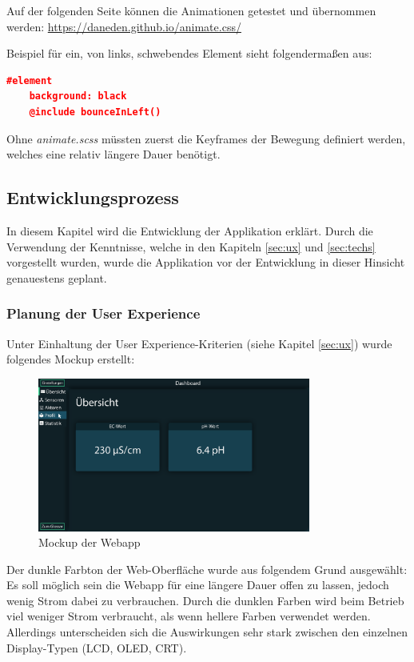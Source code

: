 Auf der folgenden Seite können die Animationen getestet und übernommen werden: \url{https://daneden.github.io/animate.css/}

Beispiel für ein, von links, schwebendes Element sieht folgendermaßen aus:
\begin{lstlisting}[language=json, caption={Animate.scss in Anwendung}]
#element
    background: black
    @include bounceInLeft()
\end{lstlisting}
\lstset{escapechar=@,style=customjava}

Ohne \textit{animate.scss} müssten zuerst die Keyframes der Bewegung definiert werden, welches eine relativ längere Dauer benötigt.
\clearpage
\subsection{Entwicklungsprozess}
In diesem Kapitel wird die Entwicklung der Applikation erklärt. Durch die Verwendung der Kenntnisse, welche in den Kapiteln \ref{sec:ux} und \ref{sec:techs} vorgestellt wurden, wurde die Applikation vor der Entwicklung in dieser Hinsicht genauestens geplant.

\subsubsection{Planung der User Experience}

Unter Einhaltung der User Experience-Kriterien (siehe Kapitel \ref{sec:ux}) wurde folgendes Mockup erstellt:

\begin{figure}[ht]
    \centering
	\includegraphics[width=0.8\textwidth]{images/webapp-mockup-normal}
	\caption{Mockup der Webapp}
\end{figure}

Der dunkle Farbton der Web-Oberfläche wurde aus folgendem Grund ausgewählt: Es soll möglich sein die Webapp für eine längere Dauer offen zu lassen, jedoch wenig Strom dabei zu verbrauchen. Durch die dunklen Farben wird beim Betrieb viel weniger Strom verbraucht, als wenn hellere Farben verwendet werden. Allerdings unterscheiden sich die Auswirkungen sehr stark zwischen den einzelnen Display-Typen (LCD, OLED, CRT).

